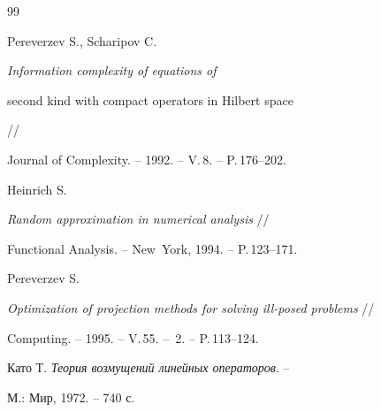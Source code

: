 \begin{thebibliography}{99}


Pereverzev S., Scharipov C.


{\em Information complexity of equations of


second kind with compact operators in Hilbert space} //


Journal of Complexity. -- 1992. -- V.\,8. -- P.\,176--202.







Heinrich S.


{\em Random approximation in numerical analysis} //


Functional Analysis. -- New~York, 1994. -- P.\,123--171.







Pereverzev S.


{\em Optimization of projection methods for solving  ill-posed problems} //


Computing. -- 1995. -- V.\,55. -- \No\,2. -- P.\,113--124.







Като Т. {\em Теория возмущений линейных операторов}. --


М.: Мир, 1972. -- 740 с.





\end{thebibliography}





\vskip 2cm












\label{end}





